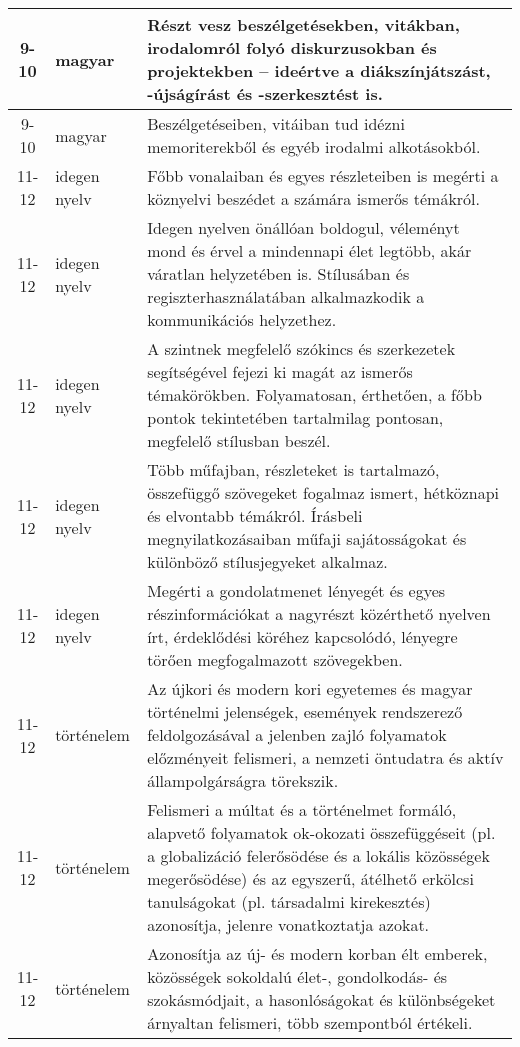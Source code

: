 \begin{small}
\begin{longtable}{c | p{2cm} |  p{11cm} }
              9-10 & magyar & Részt vesz beszélgetésekben, vitákban, irodalomról folyó diskurzusokban és projektekben – ideértve a diákszínjátszást, -újságírást és -szerkesztést is. \\ \hline
              9-10 & magyar & Beszélgetéseiben, vitáiban tud idézni memoriterekből és egyéb irodalmi alkotásokból. \\ \hline
              11-12 & idegen nyelv & Főbb vonalaiban és egyes részleteiben is megérti a köznyelvi beszédet a számára ismerős témákról. \\ \hline
              11-12 & idegen nyelv & Idegen nyelven önállóan boldogul, véleményt mond és érvel a mindennapi élet legtöbb, akár váratlan helyzetében is. Stílusában és regiszterhasználatában alkalmazkodik a kommunikációs helyzethez. \\ \hline
              11-12 & idegen nyelv & A szintnek megfelelő szókincs és szerkezetek segítségével fejezi ki magát az ismerős témakörökben. Folyamatosan, érthetően, a főbb pontok tekintetében tartalmilag pontosan, megfelelő stílusban beszél. \\ \hline
              11-12 & idegen nyelv & Több műfajban, részleteket is tartalmazó, összefüggő szövegeket fogalmaz ismert, hétköznapi és elvontabb témákról. Írásbeli megnyilatkozásaiban műfaji sajátosságokat és különböző stílusjegyeket alkalmaz. \\ \hline
              11-12 & idegen nyelv & Megérti a gondolatmenet lényegét és egyes részinformációkat a nagyrészt közérthető nyelven írt, érdeklődési köréhez kapcsolódó, lényegre törően megfogalmazott szövegekben. \\ \hline
              11-12 & történelem & Az újkori és modern kori egyetemes és magyar történelmi jelenségek, események rendszerező feldolgozásával a jelenben zajló folyamatok előzményeit felismeri, a nemzeti öntudatra és aktív állampolgárságra törekszik. \\ \hline
              11-12 & történelem & Felismeri a múltat és a történelmet formáló, alapvető folyamatok ok-okozati összefüggéseit (pl. a globalizáció felerősödése és a lokális közösségek megerősödése) és az egyszerű, átélhető erkölcsi tanulságokat (pl. társadalmi kirekesztés) azonosítja, jelenre vonatkoztatja azokat. \\ \hline
              11-12 & történelem & Azonosítja az új- és modern korban élt emberek, közösségek sokoldalú élet-, gondolkodás- és szokásmódjait, a hasonlóságokat és különbségeket árnyaltan felismeri, több szempontból értékeli. \\ \hline

\end{longtable}
\end{small}
